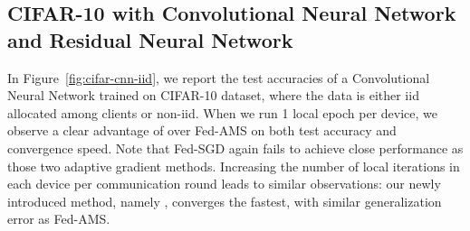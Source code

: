 \documentclass[11pt]{article}
\begin{document}
%

\vspace{-0.05in}
\subsection{CIFAR-10 with Convolutional Neural Network and Residual Neural Network}
\vspace{-0.05in}

In Figure~\ref{fig:cifar-cnn-iid}, we report the test accuracies of a Convolutional Neural Network trained on CIFAR-10 dataset, where the data is either iid allocated among clients or non-iid.
When we run 1 local epoch per device, we observe a clear advantage of \algo over Fed-AMS on both test accuracy and convergence speed.
Note that Fed-SGD again fails to achieve close performance as those two adaptive gradient methods. 
Increasing the number of local iterations in each device per communication round leads to similar observations: our newly introduced method, namely \algo, converges the fastest, with similar generalization error as Fed-AMS. 
\end{document}
